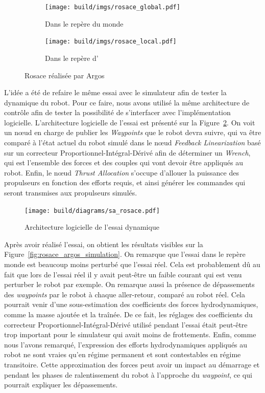 			\begin{figure}[!htb]
				\centering
				\begin{subfigure}[t]{0.48\textwidth}
					\centering
					\texttt{[image: build/imgs/rosace\_global.pdf]}
					\caption{Dans le repère du monde}
				\end{subfigure}
				\hfill
				\begin{subfigure}[t]{0.48\textwidth}
					\centering
					\texttt{[image: build/imgs/rosace\_local.pdf]}
					\caption{Dans le repère d'\argos{}}
				\end{subfigure}
				\caption{Rosace réalisée par Argos}
				\label{fig:rosace_argos}
			\end{figure}

			L'idée a été de refaire le même essai avec le simulateur afin de tester la dynamique du robot. Pour ce faire, nous avons utilisé la même architecture de contrôle afin de tester la possibilité de s'interfacer avec l'implémentation logicielle. L'architecture logicielle de l'essai est présenté sur la Figure~\ref{fig:sa_rosace}. On voit un n\oe ud en charge de publier les \textit{Waypoints} que le robot devra suivre, qui va être comparé à l'état actuel du robot simulé dans le n\oe ud \textit{Feedback Linearization} basé sur un correcteur Proportionnel-Intégral-Dérivé afin de déterminer un \textit{Wrench}, qui est l'ensemble des forces et des couples qui vont devoir être appliqués au robot. Enfin, le n\oe ud \textit{Thrust Allocation} s'occupe d'allouer la puissance des propulseurs en fonction des efforts requis, et ainsi générer les commandes qui seront transmises aux propulseurs simulés.

			\begin{figure}[!htb]
				\centering
				\texttt{[image: build/diagrams/sa\_rosace.pdf]}
				\caption{Architecture logicielle de l'essai dynamique}
				\label{fig:sa_rosace}
			\end{figure}

			Après avoir réalisé l'essai, on obtient les résultats visibles sur la Figure~\ref{fig:rosace_argos_simulation}. On remarque que l'essai dans le repère monde est beaucoup moins perturbé que l'essai réel. Cela est probablement dû au fait que lors de l'essai réel il y avait peut-être un faible courant qui est venu perturber le robot par exemple. On remarque aussi la présence de dépassements des \textit{waypoints} par le robot à chaque aller-retour, comparé au robot réel. Cela pourrait venir d'une sous-estimation des coefficients des forces hydrodynamiques, comme la masse ajoutée et la traînée. De ce fait, les réglages des coefficients du correcteur Proportionnel-Intégral-Dérivé utilisé pendant l'essai était peut-être trop important pour le simulateur qui avait moins de frottements. Enfin, comme nous l'avons remarqué, l'expression des efforts hydrodynamiques appliqués au robot ne sont vraies qu'en régime permanent et sont contestables en régime transitoire. Cette approximation des forces peut avoir un impact au démarrage et pendant les phases de ralentissement du robot à l'approche du \textit{waypoint}, ce qui pourrait expliquer les dépassements.

